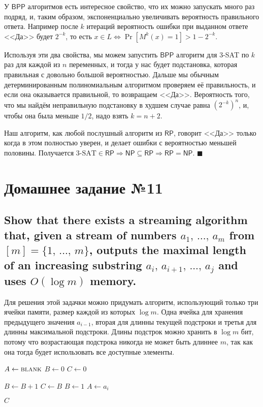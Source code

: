 \documentclass{article}
\newcommand{\RP}{\ensuremath{\mathsf{RP}}}
\newcommand{\BPP}{\ensuremath{\mathsf{BPP}}}
\newcommand{\NP}{\ensuremath{\mathsf{NP}}}
\begin{document}
  У \BPP{} алгоритмов есть интересное свойство, что их можно запускать много раз подряд, и, таким образом, экспоненциально увеличивать вероятность правильного ответа.
  Например после $k$ итераций вероятность ошибки при выданном ответе <<Да>> будет $2^{-k}$, то есть $x \in L \iff \Pr[M^k(x) = 1] > 1-2^{-k}$.

  Используя эти два свойства, мы можем запустить \BPP{} алгоритм для 3-SAT по $k$ раз для каждой из $n$ переменных,
  и тогда у нас будет подстановка, которая правильная с довольно большой вероятностью.
  Дальше мы обычным детерминированным полиномиальным алгоритмом проверяем её правильность, и если она оказывается правильной, то возвращаем <<Да>>. Вероятность того, что мы найдём неправильную подстановку в худшем случае равна $(2^{-k})^n$, и, чтобы она была меньше $1/2$, надо взять $k = n+2$.

  Наш алгоритм, как любой послушный алгоритм из \RP, говорит <<Да>> только когда в этом полностью уверен, и делает ошибки с вероятностью меньшей половины.
  Получается $\textrm{3-SAT} \in \RP \Longrightarrow \NP \subseteq \RP \Longrightarrow \RP = \NP$.
  $\blacksquare$

  \section{Домашнее задание №11}
  \setcounter{subsection}{5}
  \subsection{Show that there exists a streaming algorithm that, given a stream of numbers $a_1,\, \dots,\, a_m$ from $[m] = \{1,\, ...,\, m\}$, outputs the maximal length of an increasing substring $a_i,\, a_{i+1},\, ...,\,a_j$ and uses $O(\log m)$ memory.}
  Для решения этой задачки можно придумать алгоритм, использующий только три ячейки памяти, размер каждой из которых $\log m$.
  Одна ячейка для хранения предыдущего значения $a_{i-1}$, вторая для длинны текущей подстроки и третья для длинны максимальной подстроки.
  Длины подстрок можно хранить в $\log m$ бит, потому что возрастающая подстрока никогда не может быть длиннее $m$, так как она тогда будет использовать все доступные элементы.

  \begin{center}
    \begin{minipage}{10cm}
      \hrulefill
      \begin{algorithmic}[1]
        \State $A \gets \textsc{blank}$ 
        \State $B \gets 0$ 
        \State $C \gets 0$ 

            \State $B \gets B+1$
              \State $C \gets B$
            \EndIf
          \Else
            \State $B \gets 1$
          \EndIf
          \State $A \gets a_i$
        \EndWhile

        \State \Return $C$
      \end{algorithmic}
      \hrulefill
    \end{minipage}
  \end{center}
\end{document}
